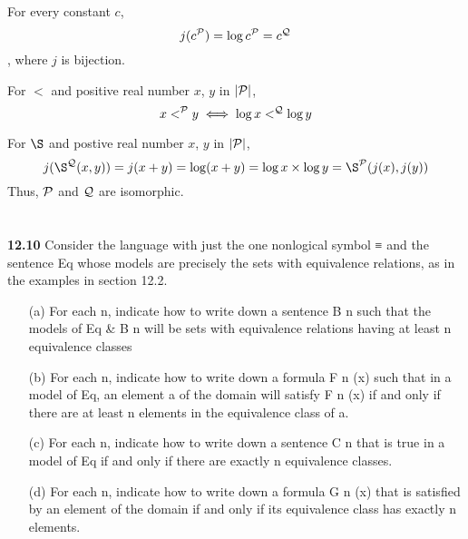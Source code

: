 \documentclass{ctexart}
\begin{document}
For every constant $c$,
$$
j(c^{\cal P}) = \log c^{\cal P} = c^{\cal Q}
$$
, where $j$ is bijection.

For $<$ and positive real number $x$, $y$ in $|\cal P|$,
$$
x <^{\cal P} y \iff \log x <^{\cal Q} \log y
$$

For $\S$ and postive real number $x$, $y$ in $|\cal P|$,
$$
j(\S^{\cal Q}(x, y)) = j(x + y) =  \log(x + y) =  \log x \times \log y =  \S^{\cal P}(j(x), j(y))
$$
Thus, $\cal P$ and $\cal Q$ are isomorphic.

\section*{}
\textbf{12.10} Consider the language with just the one nonlogical symbol ≡ and the sentence
Eq whose models are precisely the sets with equivalence relations, as in the
examples in section 12.2.
\begin{itemize}
\item[(a)] For each n, indicate how to write down a sentence B n such that the
models of Eq \& B n will be sets with equivalence relations having at least
n equivalence classes
\item[(b)] For each n, indicate how to write down a formula F n (x) such that in a
model of Eq, an element a of the domain will satisfy F n (x) if and only if
there are at least n elements in the equivalence class of a.
\item[(c)] For each n, indicate how to write down a sentence C n that is true in a
model of Eq if and only if there are exactly n equivalence classes.
\item[(d)] For each n, indicate how to write down a formula G n (x) that is satisfied
by an element of the domain if and only if its equivalence class has
exactly n elements.
\end{itemize}
\end{document}
